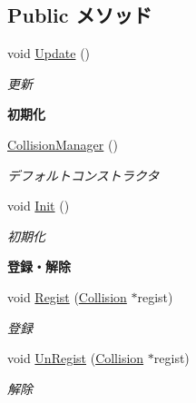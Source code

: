 \subsection*{Public メソッド}
\begin{DoxyCompactItemize}
\item 
void \hyperlink{class_collision_manager_a23c21d077dbfd7ca86e7c0649d775dfc}{Update} ()
\begin{DoxyCompactList}\small\item\em 更新 \end{DoxyCompactList}\end{DoxyCompactItemize}
\begin{Indent}{\bf 初期化}\par
\begin{DoxyCompactItemize}
\item 
\hyperlink{class_collision_manager_a81f0b3f0cc0268c80f54714cd7ddb55f}{Collision\-Manager} ()
\begin{DoxyCompactList}\small\item\em デフォルトコンストラクタ \end{DoxyCompactList}\item 
void \hyperlink{class_collision_manager_a2c5770b90b7a46a5674df008a7a57145}{Init} ()
\begin{DoxyCompactList}\small\item\em 初期化 \end{DoxyCompactList}\end{DoxyCompactItemize}
\end{Indent}
\begin{Indent}{\bf 登録・解除}\par
\begin{DoxyCompactItemize}
\item 
void \hyperlink{class_collision_manager_aea854ed318c39ba12803071813d20319}{Regist} (\hyperlink{class_collision}{Collision} $\ast$regist)
\begin{DoxyCompactList}\small\item\em 登録 \end{DoxyCompactList}\item 
void \hyperlink{class_collision_manager_a23ae00ba7f592d6029d3bb16b0bc0100}{Un\-Regist} (\hyperlink{class_collision}{Collision} $\ast$regist)
\begin{DoxyCompactList}\small\item\em 解除 \end{DoxyCompactList}\end{DoxyCompactItemize}
\end{Indent}
